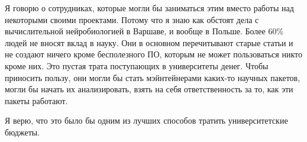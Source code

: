 \documentclass[10pt, a5paper]{article}
\begin{document}
\begin{Parallel}[p]{}{}
{Я говорю о сотрудниках, которые могли бы заниматься этим вместо работы над некоторыми своими проектами. Потому что я знаю как обстоят дела с вычислительной нейробиологией в Варшаве, и вообще в Польше. Более 60\% людей не вносят вклад в науку. Они в основном перечитывают старые статьи и не создают ничего кроме бесполезного ПО, которым не может пользоваться никто кроме них. Это пустая трата поступающих в университеты денег. Чтобы приносить пользу, они могли бы стать мэйнтейнерами каких-то научных пакетов, могли бы начать их анализировать, взять на себя ответственность за то, как эти пакеты работают.

Я верю, что это было бы одним из лучших способов тратить университетские бюджеты. 


     }
   \end{Parallel}









 
\end{document}
